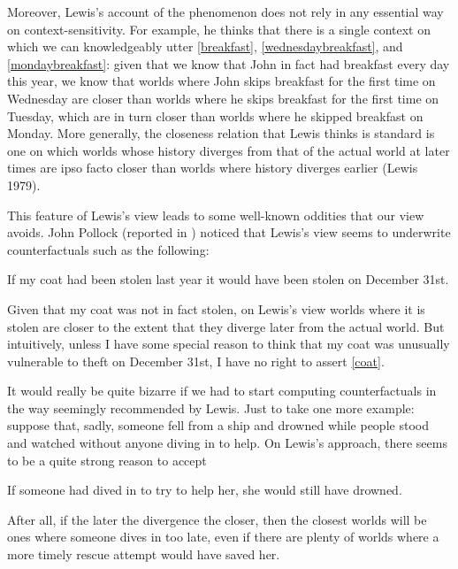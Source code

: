 \documentclass[If.tex]{subfiles}
\begin{document}
 Moreover, Lewis's account of the phenomenon does not rely in any essential way on context-sensitivity. For example, he thinks that there is a single context on which we can knowledgeably utter \ref{breakfast}, \ref{wednesdaybreakfast}, and \ref{mondaybreakfast}: given that we know that John in fact had breakfast every day this year, we know that worlds where John skips breakfast for the first time on Wednesday are closer than worlds where he skips breakfast for the first time on Tuesday, which are in turn closer than worlds where he skipped breakfast on Monday. More generally, the closeness relation that Lewis thinks is standard is one on which worlds whose history diverges from that of the actual world at later times are ipso facto closer than worlds where history diverges earlier (Lewis 1979).

This feature of Lewis's view leads to some well-known oddities that our view avoids. John Pollock (reported in \cite{NuteTCL}) noticed that Lewis's view seems to underwrite counterfactuals such as the following:
\begin{prop}
	\nitem \label{coat}
		If my coat had been stolen last year it would have been stolen on December 31st.
\end{prop}
Given that my coat was not in fact stolen, on Lewis's view worlds where it is stolen are closer to the extent that they diverge later from the actual world.%
 But intuitively, unless I have some special reason to think that my coat was unusually vulnerable to theft on December 31st, I have no right to assert \ref{coat}.

It would really be quite bizarre if we had to start computing counterfactuals in the way seemingly recommended by Lewis. Just to take one more example: suppose that, sadly, someone fell from a ship and drowned while people stood and watched without anyone diving in to help. On Lewis's approach, there seems to be a quite strong reason to accept
\begin{prop}
	\nitem \label{drowning}
		If someone had dived in to try to help her, she would still have drowned.
\end{prop}
After all, if the later the divergence the closer, then the closest worlds will be ones where someone dives in too late, even if there are plenty of worlds where a more timely rescue attempt would have saved her.
\end{document}
